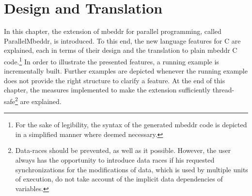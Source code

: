 \chapter{Design and Translation}
\label{design_translation}
In this chapter, the extension of mbeddr for parallel programming, called ParallelMbeddr, is introduced. To this end, the new language features for C are explained, each in terms of their design and the translation to plain mbeddr C code.\footnote{For the sake of legibility, the syntax of the generated mbeddr code is depicted in a simplified manner where deemed necessary.} In order to illustrate the presented features, a running example is incrementally built. Further examples are depicted whenever the running example does not provide the right structure to clarify a feature. At the end of this chapter, the measures implemented to make the extension sufficiently thread-safe\footnote{Data-races should be prevented, as well as it possible. However, the user always has the opportunity to introduce data races if his requested synchronizations for the modifications of data, which is used by multiple units of execution, do not take account of the implicit data dependencies of variables.} are explained.





